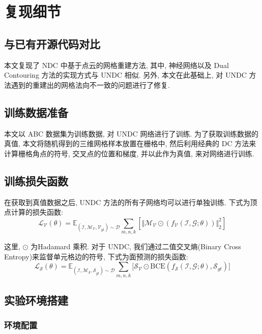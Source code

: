 \section{复现细节}

\subsection{与已有开源代码对比}

本文复现了 NDC 中基于点云的网格重建方法, 其中, 神经网络以及 Dual Contouring 方法的实现方式与 UNDC 相似. 
另外, 本文在此基础上, 对 UNDC 方法遇到的重建出的网格法向不一致的问题进行了修复. 

\subsection{训练数据准备}
本文以 ABC 数据集为训练数据, 对 UNDC 网络进行了训练. 
为了获取训练数据的真值, 本文将随机得到的三维网格样本放置在栅格中, 然后利用经典的 DC 方法来计算栅格角点的符号, 交叉点的位置和梯度, 并以此作为真值, 来对网络进行训练. 

\subsection{训练损失函数}

在获取到真值数据之后, UNDC 方法的所有子网络均可以进行单独训练. 
下式为顶点计算的损失函数: 
\begin{equation}
    \mathcal{L_V}(\theta)=\mathbb{E}_{(\mathcal{I, M_V, V}_{gt})\sim \mathcal{D}}\sum _{m,n,k} [ \Vert \mathcal{M_V} \odot (f_{\mathcal{V}}(\mathcal{I,G};\theta)) \Vert ^2_2 ]
\end{equation}

这里, $\odot$ 为Hadamard 乘积. 对于 UNDC, 我们通过二值交叉熵(Binary Cross Entropy)来监督单元格边的符号, 下式为面预测的损失函数:
\begin{equation}
    \mathcal{L_S}(\theta)=\mathbb{E}_{(\mathcal{I, M_S, S}_{gt})\sim \mathcal{D}}\sum_{m,n,k} \lbrack \mathcal{S_V} \odot \mathrm{BCE}(f_\mathcal{S}(\mathcal{I,G};\theta), \mathcal{S}_{gt}) \rbrack
\end{equation}

\subsection{实验环境搭建}

\subsubsection{环境配置}
\vspace{0.5em} %
